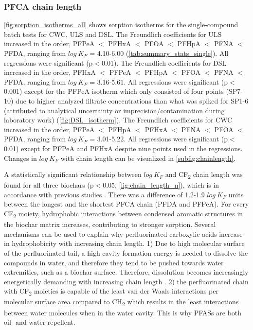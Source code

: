 \subsubsection{PFCA chain length}
\cref{fig:sorption_isotherms_all} shows sorption isotherms for the single-compound batch tests for CWC, ULS and DSL. The Freundlich coefficients for ULS increased in the order, PFPeA $<$ PFHxA $<$ PFOA $<$ PFHpA $<$ PFNA $<$ PFDA, ranging from $log~K_F$ = 4.10-6.00 (\cref{tab:summary_stats_single}). All regressions were significant (p$<$0.01). The Freundlich coefficients for DSL increased in the order, PFHxA $<$ PFPeA $<$ PFHpA $<$ PFOA $<$ PFNA $<$ PFDA, ranging from $log~K_F$ = 3.16-5.61. All regressions were significant (p$<$0.001) except for the PFPeA isotherm which only consisted of four points (SP7-10) due to higher analyzed filtrate concentrations than what was spiked for SP1-6 (attributed to analytical uncertainty or imprecision/contamination during laboratory work) (\cref{fig:DSL_isotherm}). The Freundlich coefficients for CWC increased in the order, PFPeA $<$ PFHpA $<$ PFHxA $<$ PFNA $<$ PFOA $<$ PFDA, ranging from $log~K_F$ = 3.01-5.22. All regressions were significant (p$<$0.01) except for PFPeA and PFHxA despite nine points used in the regressions. Changes in $log~K_F$ with chain length can be visualized in \cref{subfig:chainlength}. 

A statistically significant relationship between $log~K_F$ and CF\textsubscript{2} chain length was found for all three biochars (p$<$0.05, \cref{fig:chain_length_n}), which is in accordance with previous studies \citep{Sorengard2019,higgins2006sorption,ahmed2020per}. There was a difference of 1.2-1.9 $log~K_F$ units between the longest and the shortest PFCA chain (PFDA and PFPeA). For every CF\textsubscript{2} moiety, hydrophobic interactions between condensed aromatic structures in the biochar matrix increases, contributing to stronger sorption. Several mechanisms can be used to explain why perfluorinated carboxylic acids increase in hydrophobicity with increasing chain length. 1) Due to high molecular surface of the perfluorinated tail, a high cavity formation energy is needed to dissolve the compounds in water, and therefore they tend to be pushed towards water extremities, such as a biochar surface. Therefore, dissolution becomes increasingly energetically demanding with increasing chain length \citep{sigmund2022sorption}. 2) the perfluorinated chain with CF\textsubscript{2} moieties is capable of the least van der Waals interactions per molecular surface area compared to CH\textsubscript{2} which results in the least interactions between water molecules when in the water cavity. This is why PFASs are both oil- and water repellent. 

